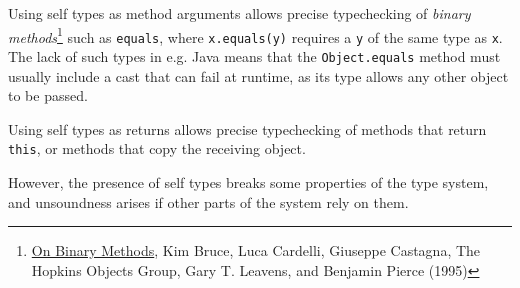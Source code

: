 \documentclass[11pt,oneside]{article}
\newcommand{\code}[1]{\texttt{#1}}
\begin{document}
Using self types as method arguments allows precise typechecking of \emph{binary methods}\footnote{\href{https://core.ac.uk/download/pdf/38891811.pdf}{On Binary Methods}, Kim Bruce, Luca Cardelli, Giuseppe Castagna, The Hopkins Objects Group, Gary T. Leavens, and Benjamin Pierce (1995)} such as \code{equals}, where \code{x.equals(y)} requires a \code{y} of the same type as \code{x}. The lack of such types in e.g. Java means that the \code{Object.equals} method must usually include a cast that can fail at runtime, as its type allows any other object to be passed.

Using self types as returns allows precise typechecking of methods that return \code{this}, or methods that copy the receiving object.

However, the presence of self types breaks some properties of the type system, and unsoundness arises if other parts of the system rely on them.
\end{document}
